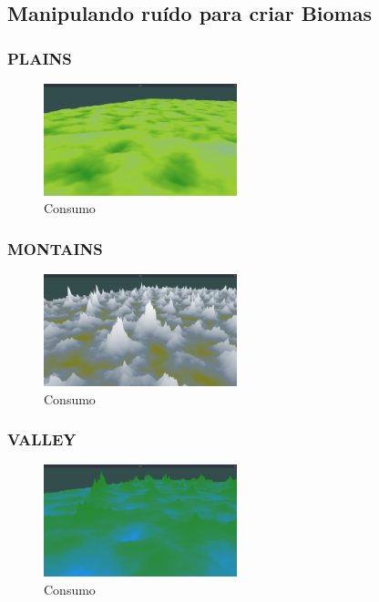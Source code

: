 \subsection{Manipulando ruído para criar Biomas}
\subsubsection{PLAINS}

\begin{figure}[H]
    \centering
    \includegraphics[width=0.5\textwidth]{figuras/bssPlains.png}
    \caption{Consumo}
    \label{fig:bssPlains}
\end{figure}

\subsubsection{MONTAINS}


\begin{figure}[H]
    \centering
    \includegraphics[width=0.5\textwidth]{figuras/bssMontains.png}
    \caption{Consumo}
    \label{fig:bssMontains}
\end{figure}

\subsubsection{VALLEY}


\begin{figure}[H]
    \centering
    \includegraphics[width=0.5\textwidth]{figuras/bssValley.png}
    \caption{Consumo}
    \label{fig:bssValley}
\end{figure}

